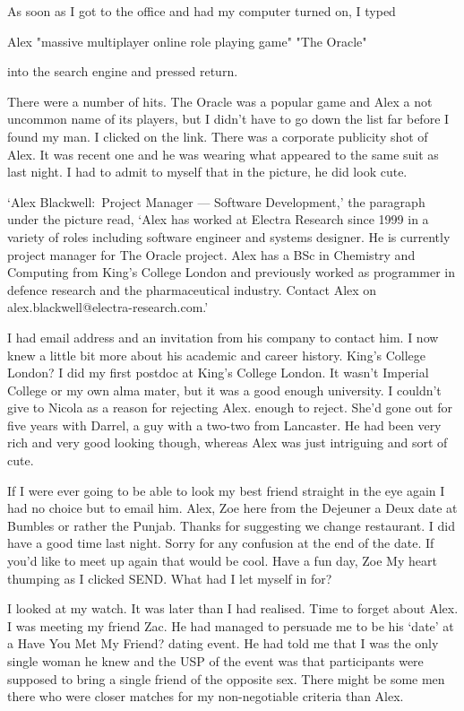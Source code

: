 As soon as I got to the office and had my computer turned on, I
typed

{\twelvett Alex "massive multiplayer online role playing game" "The Oracle"}

into the search engine and pressed return.

There were a number of hits. {\twelvesl The Oracle\/} was
a popular game and Alex a not uncommon name of its players, but I didn't have to go down the list far before I found
my man. I clicked on the link. There was a corporate publicity shot
of Alex. It was recent one and he was wearing what appeared to the same
suit as last night. I had to admit to myself that in the picture, he
did look cute.

`Alex Blackwell:~Project Manager --- Software Development,' the
paragraph under the picture read, `Alex has worked at Electra
Research since 1999 in a variety of roles including software
engineer and systems designer. He is currently project manager for
{\twelvesl The Oracle\/} project. Alex has a BSc in Chemistry and Computing from
King's College London and previously worked as programmer in defence research and the pharmaceutical industry. Contact Alex on
alex.blackwell@electra-research.com.'

I had email address and an invitation from his company to contact
him. I now knew a little bit more about his academic and career
history. King's College London? I did my first postdoc at King's
College London. It wasn't Imperial College or my own alma
mater, but it was a good enough university. I couldn't give to Nicola as
a reason for rejecting Alex. enough to reject. She'd
gone out for five years with Darrel, a guy with a two-two from Lancaster. He had been very rich and very good looking though, whereas
Alex was just intriguing and sort of cute.

If I were ever going to be able to look my best friend straight in
the eye again I had no choice but to email him.
\frenchspacing
\vskip 12pt
{\tentt\obeylines  Alex,
\vskip 12pt
Zoe here from the Dejeuner a Deux date at Bumbles
or rather the Punjab. Thanks for suggesting we
change restaurant. I did have a good time
last night. Sorry for any confusion at the end
of the date. If you'd like to meet up again
that would be cool.
\vskip 12pt
Have a fun day,
\vskip 12pt
Zoe}
\vskip 12pt
My heart thumping as I clicked {\twelvess SEND}.  What had I let
myself in for?

\nonfrenchspacing
I looked at my watch. It was later than I had realised. Time to
forget about Alex. I was meeting my friend Zac. He had managed to
persuade me to be his `date' at a Have You Met My Friend? dating
event. He had told me that
I was the only single woman he knew and the USP of the event was
that participants were supposed to bring a single friend of the
opposite sex. There might be some men there who were closer matches for my
non-negotiable criteria than Alex.

